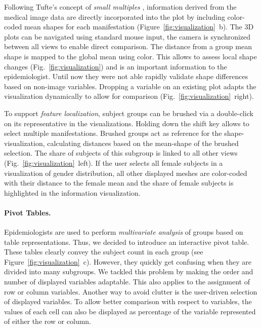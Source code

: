 \documentclass[journal]{style/vgtc} 			          %
\begin{document}
%
%
Following Tufte's concept of \emph{small multiples} \cite{Tufte1983}, information derived from the medical image data are directly incorporated into the plot by including color-coded mean shapes for each manifestation (Figure~\ref{fig:visualization}~b).
%
The 3D plots can be navigated using standard mouse input, the camera is synchronized between all views to enable direct comparison.
%
The distance from a group mean shape is mapped to the global mean using color.
%
This allows to assess local shape changes (Fig.~\ref{fig:visualization}) and is an important information to the epidemiologist.
%
Until now they were not able rapidly validate shape differences based on non-image variables.
%
Dropping a variable on an existing plot adapts the visualization dynamically to allow for comparison (Fig.~\ref{fig:visualization}~right).

To support \emph{feature localization}, subject groups can be brushed via a double-click on its representative in the visualizations.
%
Holding down the shift key allows to select multiple manifestations.
%
Brushed groups act as reference for the shape-visualization, calculating distances based on the mean-shape of the brushed selection.
%
The share of subjects of this subgroup is linked to all other views (Fig.~\ref{fig:visualization}~left).
%
If the user selects all female subjects in a visualization of gender distribution, all other displayed meshes are color-coded with their distance to the female mean and the share of female subjects is highlighted in the information visualization.
%

\paragraph{Pivot Tables.}
%
Epidemiologists are used to perform \emph{multivariate analysis} of groups based on table representations.
%
Thus, we decided to introduce an interactive pivot table.
%
These tables clearly convey the subject count in each group (see Figure~\ref{fig:visualization}~c).
%
However, they quickly get confusing when they are divided into many subgroups.
%
We tackled this problem by making the order and number of displayed variables adaptable.
%
This also applies to the assignment of row or column variables.
%
Another way to avoid clutter is the user-driven selection of displayed variables.
%
To allow better comparison with respect to variables, the values of each cell can also be displayed as percentage of the variable represented of either the row or column.
\end{document}

